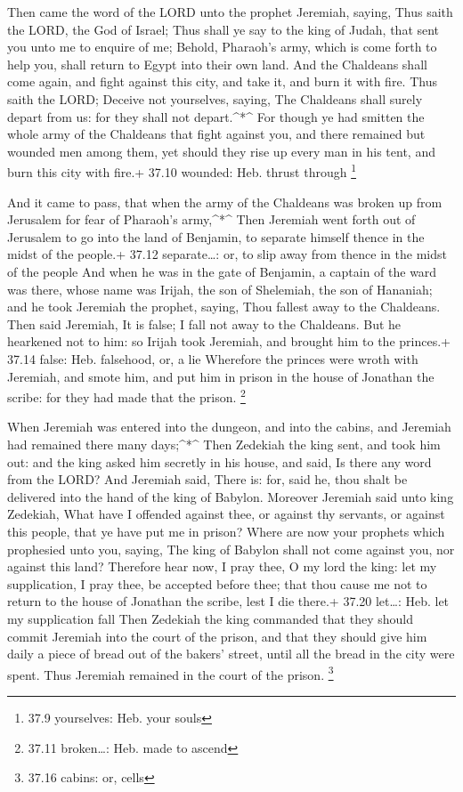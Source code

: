  Then came the word of the LORD unto the prophet Jeremiah,
saying,  Thus saith the LORD, the God of Israel; Thus shall
ye say to the king of Judah, that sent you unto me to enquire of me;
Behold, Pharaoh's army, which is come forth to help you, shall return to
Egypt into their own land.  And the Chaldeans shall come
again, and fight against this city, and take it, and burn it with fire.
 Thus saith the LORD; Deceive not yourselves, saying, The
Chaldeans shall surely depart from us: for they shall not
depart.\^{}*\^{}  For though ye had smitten the whole army
of the Chaldeans that fight against you, and there remained but wounded
men among them, yet should they rise up every man in his tent, and burn
this city with fire.+ 37.10 wounded: Heb. thrust through \footnote{37.9
  yourselves: Heb. your souls}

 And it came to pass, that when the army of the Chaldeans
was broken up from Jerusalem for fear of Pharaoh's army,\^{}*\^{}
 Then Jeremiah went forth out of Jerusalem to go into the
land of Benjamin, to separate himself thence in the midst of the
people.+ 37.12 separate\ldots: or, to slip away from thence in the midst
of the people  And when he was in the gate of Benjamin, a
captain of the ward was there, whose name was Irijah, the son of
Shelemiah, the son of Hananiah; and he took Jeremiah the prophet,
saying, Thou fallest away to the Chaldeans.  Then said
Jeremiah, It is false; I fall not away to the Chaldeans. But he
hearkened not to him: so Irijah took Jeremiah, and brought him to the
princes.+ 37.14 false: Heb. falsehood, or, a lie  Wherefore
the princes were wroth with Jeremiah, and smote him, and put him in
prison in the house of Jonathan the scribe: for they had made that the
prison. \footnote{37.11 broken\ldots: Heb. made to ascend}

 When Jeremiah was entered into the dungeon, and into the
cabins, and Jeremiah had remained there many days;\^{}*\^{}
 Then Zedekiah the king sent, and took him out: and the
king asked him secretly in his house, and said, Is there any word from
the LORD? And Jeremiah said, There is: for, said he, thou shalt be
delivered into the hand of the king of Babylon.  Moreover
Jeremiah said unto king Zedekiah, What have I offended against thee, or
against thy servants, or against this people, that ye have put me in
prison?  Where are now your prophets which prophesied unto
you, saying, The king of Babylon shall not come against you, nor against
this land?  Therefore hear now, I pray thee, O my lord the
king: let my supplication, I pray thee, be accepted before thee; that
thou cause me not to return to the house of Jonathan the scribe, lest I
die there.+ 37.20 let\ldots: Heb. let my supplication fall 
Then Zedekiah the king commanded that they should commit Jeremiah into
the court of the prison, and that they should give him daily a piece of
bread out of the bakers' street, until all the bread in the city were
spent. Thus Jeremiah remained in the court of the prison. \footnote{37.16
  cabins: or, cells}

